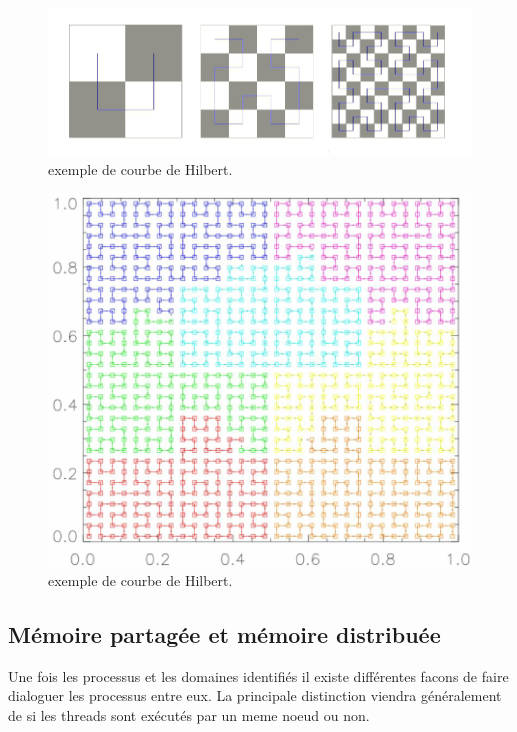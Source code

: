 \begin{figure}[bth]
        \includegraphics[width=.95\linewidth]{img/02/courbe_Hilbert.jpeg} 
        \caption{exemple de courbe de Hilbert. 
}
 		\label{fig:hilbert}
\end{figure}


\begin{figure}[bth]
        \includegraphics[width=.95\linewidth]{img/02/hilbert2.png} 
        \caption{exemple de courbe de Hilbert. 
}
 		\label{fig:hilbert2}
\end{figure}


\subsection{Mémoire partagée et mémoire distribuée}

Une fois les processus et les domaines identifiés il existe différentes facons de faire dialoguer les processus entre eux.
La principale distinction viendra généralement de si les threads sont exécutés par un meme noeud ou non.

